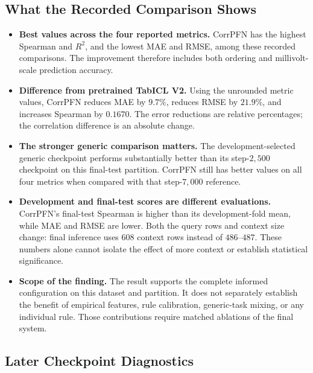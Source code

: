 \documentclass[11pt]{article}
\newenvironment{notes}
  {\begin{itemize}\setlength{\itemsep}{0.45em}\setlength{\parsep}{0pt}}
  {\end{itemize}}
\begin{document}
\subsection{What the Recorded Comparison Shows}
\label{sec:final-result-interpretation}

\begin{notes}
    \item \textbf{Best values across the four reported metrics.}
    CorrPFN has the highest Spearman and \(R^2\), and the
    lowest MAE and RMSE, among these recorded comparisons.
    The improvement therefore includes both ordering and
    millivolt-scale prediction accuracy.

    \item \textbf{Difference from pretrained TabICL V2.}
    Using the unrounded metric values, CorrPFN reduces MAE
    by \(9.7\%\), reduces RMSE by \(21.9\%\), and increases
    Spearman by \(0.1670\).
    The error reductions are relative percentages; the
    correlation difference is an absolute change.

    \item \textbf{The stronger generic comparison matters.}
    The development-selected generic checkpoint performs
    substantially better than its step-\(2{,}500\) checkpoint
    on this final-test partition. CorrPFN still has better
    values on all four metrics when compared with that
    step-\(7{,}000\) reference.

    \item \textbf{Development and final-test scores are different evaluations.}
    CorrPFN's final-test Spearman is higher than its
    development-fold mean, while MAE and RMSE are lower.
    Both the query rows and context size change: final
    inference uses \(608\) context rows instead of
    \(486\)--\(487\).
    These numbers alone cannot isolate the effect of more
    context or establish statistical significance.

    \item \textbf{Scope of the finding.}
    The result supports the complete informed configuration
    on this dataset and partition.
    It does not separately establish the benefit of empirical
    features, rule calibration, generic-task mixing, or any
    individual rule. Those contributions require matched
    ablations of the final system.
\end{notes}

\subsection{Later Checkpoint Diagnostics}
\label{sec:post-selection-diagnostics}
\end{document}
